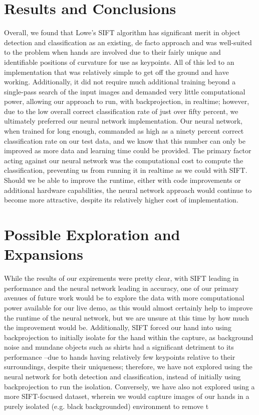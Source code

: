 \section{Results and Conclusions}

Overall, we found that Lowe's SIFT algorithm has significant merit in object detection and classification as an existing, de facto approach and was well-suited to the problem when hands are involved due to their fairly unique and identifiable positions of curvature for use as keypoints. All of this led to an implementation that was relatively simple to get off the ground and have working. Additionally, it did not require much additional training beyond a single-pass search of the input images and demanded very little computational power, allowing our approach to run, with backprojection, in realtime; however, due to the low overall correct classification rate of just over fifty percent, we ultimately preferred our neural network implementation. Our neural network, when trained for long enough, commanded as high as a ninety percent correct classification rate on our test data, and we know that this number can only be improved as more data and learning time could be provided. The primary factor acting against our neural network was the computational cost to compute the classification, preventing us from running it in realtime as we could with SIFT. Should we be able to improve the runtime, either with code improvements or additional hardware capabilities, the neural network approach would continue to become more attractive, despite its relatively higher cost of implementation.

\section{Possible Exploration and Expansions}

While the results of our expirements were pretty clear, with SIFT leading in performance and the neural network leading in accuracy, one of our primary avenues of future work would be to explore the data with more computational power available for our live demo, as this would almost certainly help to improve the runtime of the neural network, but we are unsure at this time by how much the improvement would be. Additionally, SIFT forced our hand into using backprojection to initially isolate for the hand within the capture, as background noise and mundane objects such as shirts had a significant detriment to its performance --due to hands having relatively few keypoints relative to their surroundings, despite their uniqueness; therefore, we have not explored using the neural network for both detection and classification, instead of initially using backprojection to run the isolation. Conversely, we have also not explored using a more SIFT-focused dataset, wherein we would capture images of our hands in a purely isolated (e.g. black backgrounded) environment to remove t